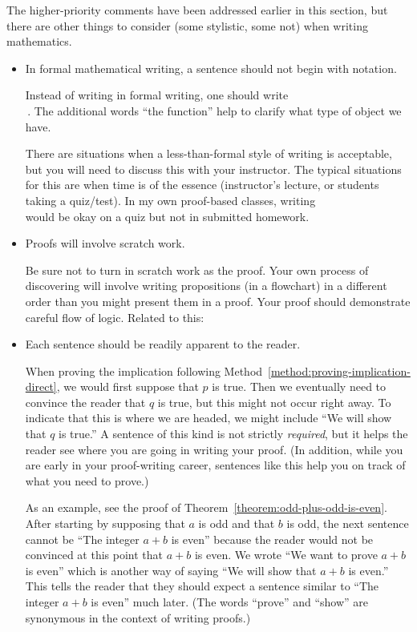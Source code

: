 \documentclass{book}
\theoremstyle{ekimcustom}
\begin{document}
The higher-priority comments have been addressed earlier in this section, but there are other things to consider (some stylistic, some not) when writing mathematics.
\begin{itemize}
\item In formal mathematical writing, a sentence should not begin with notation.

Instead of writing  in formal writing, one should write\\ \,. The additional words ``the function'' help to clarify what type of object we have.

There are situations when a less-than-formal style of writing is acceptable, but you will need to discuss this with your instructor. The typical situations for this are when time is of the essence (instructor's lecture, or students taking a quiz/test). In my own proof-based classes, writing\\  would be okay on a quiz but not in submitted homework.

\item Proofs will involve scratch work.

Be sure not to turn in scratch work as the proof. Your own process of discovering will involve writing propositions (in a flowchart) in a different order than you might present them in a proof. Your proof should demonstrate careful flow of logic. Related to this:

\item Each sentence should be readily apparent to the reader.

When proving the implication following Method~\ref{method:proving-implication-direct}, we would first suppose that $p$ is true. Then we eventually need to convince the reader that $q$ is true, but this might not occur right away. To indicate that this is where we are headed, we might include ``We will show that $q$ is true.'' A sentence of this kind is not strictly \emph{required}, but it helps the reader see where you are going in writing your proof. (In addition, while you are early in your proof-writing career, sentences like this help you on track of what you need to prove.)

As an example, see the proof of Theorem~\ref{theorem:odd-plus-odd-is-even}. After starting by supposing that $a$ is odd and that $b$ is odd, the next sentence cannot be ``The integer $a+b$ is even'' because the reader would not be convinced at this point that $a+b$ is even. We wrote ``We want to prove $a+b$ is even'' which is another way of saying ``We will show that $a+b$ is even.'' This tells the reader that they should expect a sentence similar to ``The integer $a+b$ is even'' much later. (The words ``prove'' and ``show'' are synonymous in the context of writing proofs.)


\end{itemize}
\end{document}
